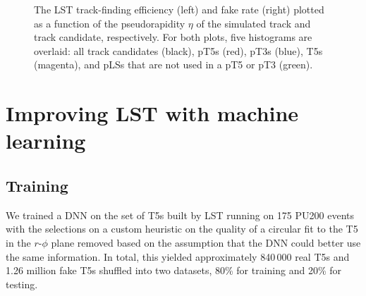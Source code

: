 \begin{figure}[!htb]
    \centering
    \qquad
    \caption[LST track-finding efficiency and fake rate plotted as a function of $\eta$.]{
        The LST track-finding efficiency (left) and fake rate (right) plotted as a function of the pseudorapidity $\eta$ of the simulated track and track candidate, respectively.
        For both plots, five histograms are overlaid: all track candidates (black), pT5s (red), pT3s (blue), T5s (magenta), and pLSs that are not used in a pT5 or pT3 (green).
    }
    \label{fig:lst_performance}
\end{figure}

\section{Improving LST with machine learning}

\subsection{Training}
We trained a DNN on the set of T5s built by LST running on 175 \ttbar PU200 events with the selections on a custom heuristic on the quality of a circular fit to the T5 in the $r$-$\phi$ plane removed based on the assumption that the DNN could better use the same information. 
In total, this yielded approximately 840\,000 real T5s and 1.26 million fake T5s shuffled into two datasets, 80\% for training and 20\% for testing. 


